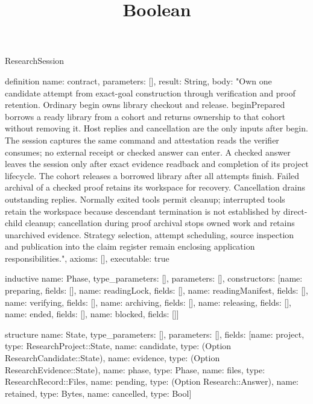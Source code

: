 \begin{lexlean}{ResearchSession}
\title{Boolean}
\begin{semanticmodule}

definition{
 name: contract,
 parameters: [],
 result: String,
 body: "Own one candidate attempt from exact-goal construction through verification and proof retention. Ordinary begin owns library checkout and release. beginPrepared borrows a ready library from a cohort and returns ownership to that cohort without removing it. Host replies and cancellation are the only inputs after begin. The session captures the same command and attestation reads the verifier consumes; no external receipt or checked answer can enter. A checked answer leaves the session only after exact evidence readback and completion of its project lifecycle. The cohort releases a borrowed library after all attempts finish. Failed archival of a checked proof retains its workspace for recovery. Cancellation drains outstanding replies. Normally exited tools permit cleanup; interrupted tools retain the workspace because descendant termination is not established by direct-child cleanup; cancellation during proof archival stops owned work and retains unarchived evidence. Strategy selection, attempt scheduling, source inspection and publication into the claim register remain enclosing application responsibilities.",
 axioms: [],
 executable: true
}

inductive{
 name: Phase,
 type_parameters: [],
 parameters: [],
 constructors: [{name: preparing, fields: []}, {name: readingLock, fields: []}, {name: readingManifest, fields: []}, {name: verifying, fields: []}, {name: archiving, fields: []}, {name: releasing, fields: []}, {name: ended, fields: []}, {name: blocked, fields: []}]
}

structure{
 name: State,
 type_parameters: [],
 parameters: [],
 fields: [{name: project, type: ResearchProject::State}, {name: candidate, type: (Option ResearchCandidate::State)}, {name: evidence, type: (Option ResearchEvidence::State)}, {name: phase, type: Phase}, {name: files, type: ResearchRecord::Files}, {name: pending, type: (Option Research::Answer)}, {name: retained, type: Bytes}, {name: cancelled, type: Bool}]
}


\end{semanticmodule}
\end{lexlean}
